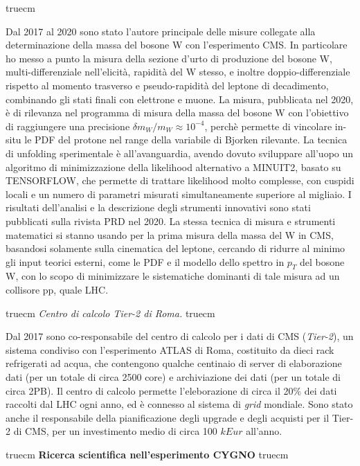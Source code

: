 \documentclass[11pt,twoside,a4paper]{article}
\begin{document}
 truecm

Dal 2017 al 2020 sono stato l'autore principale delle misure collegate
alla determinazione della massa del bosone W con l'esperimento CMS. In
particolare ho messo a punto la misura della sezione d'urto di
produzione del bosone W, multi-differenziale nell'elicit\`a,
rapidit\`a del W stesso, e inoltre doppio-differenziale rispetto al
momento trasverso e pseudo-rapidit\`a del leptone di decadimento,
combinando gli stati finali con elettrone e muone. La misura,
pubblicata nel 2020, \`e di rilevanza nel programma di misura della
massa del bosone W con l'obiettivo di raggiungere una precisione
$\delta m_W/m_W\approx 10^{-4}$, perch\`e permette di vincolare
in-situ le PDF del protone nel range della variabile di Bjorken
rilevante. La tecnica di unfolding sperimentale \`e all'avanguardia,
avendo dovuto sviluppare all'uopo un algoritmo di minimizzazione della
likelihood alternativo a \textsc{MINUIT2}, basato su
\textsc{TENSORFLOW}, che permette di trattare likelihood molto
complesse, con cuspidi locali e un numero di parametri misurati
simultaneamente superiore al migliaio. I risultati dell'analisi e la
descrizione degli strumenti innovativi sono stati pubblicati sulla
rivista PRD nel 2020. La stessa tecnica di misura e strumenti
matematici si stanno usando per la prima misura della massa del W in
CMS, basandosi solamente sulla cinematica del leptone, cercando di
ridurre al minimo gli input teorici esterni, come le PDF e il modello
dello spettro in $p_T$ del bosone W, con lo scopo di minimizzare le
sistematiche dominanti di tale misura ad un collisore pp, quale LHC.

 truecm
\textit{Centro di calcolo Tier-2 di Roma.}
 truecm

Dal 2017 sono co-responsabile del centro di calcolo per i dati di CMS
(\textit{Tier-2}), un sistema condiviso con l'esperimento ATLAS di
Roma, costituito da dieci rack refrigerati ad acqua, che contengono
qualche centinaio di server di elaborazione dati (per un totale di
circa 2500 core) e archiviazione dei dati (per un totale di circa
2PB). Il centro di calcolo permette l'eleborazione di circa il 20\%
dei dati raccolti dal LHC ogni anno, ed \`e connesso al sistema di
\textit{grid} mondiale. Sono stato anche il responsabile della
pianificazione degli upgrade e degli acquisti per il Tier-2 di CMS,
per un investimento medio di circa 100 $kEur$ all'anno.


 truecm
{\bf{Ricerca scientifica nell'esperimento CYGNO}}
 truecm
\end{document}
